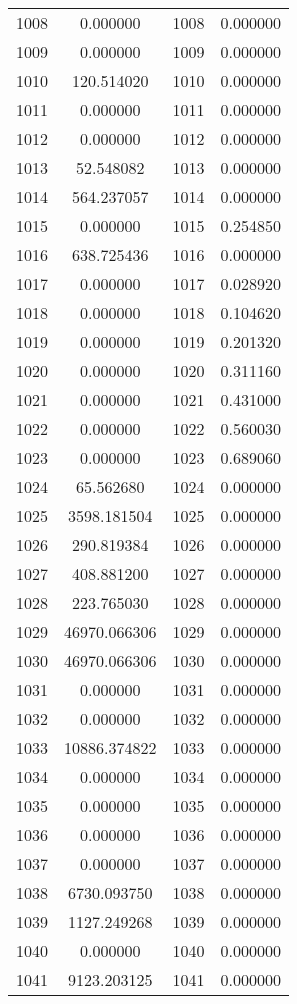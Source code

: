 \documentclass[12pt]{article}
\begin{document}
\begin{longtable}{@{}cccc@{}}
1008 & 0.000000 & 1008 & 0.000000 \\
1009 & 0.000000 & 1009 & 0.000000 \\
1010 & 120.514020 & 1010 & 0.000000 \\
1011 & 0.000000 & 1011 & 0.000000 \\
1012 & 0.000000 & 1012 & 0.000000 \\
1013 & 52.548082 & 1013 & 0.000000 \\
1014 & 564.237057 & 1014 & 0.000000 \\
1015 & 0.000000 & 1015 & 0.254850 \\
1016 & 638.725436 & 1016 & 0.000000 \\
1017 & 0.000000 & 1017 & 0.028920 \\
1018 & 0.000000 & 1018 & 0.104620 \\
1019 & 0.000000 & 1019 & 0.201320 \\
1020 & 0.000000 & 1020 & 0.311160 \\
1021 & 0.000000 & 1021 & 0.431000 \\
1022 & 0.000000 & 1022 & 0.560030 \\
1023 & 0.000000 & 1023 & 0.689060 \\
1024 & 65.562680 & 1024 & 0.000000 \\
1025 & 3598.181504 & 1025 & 0.000000 \\
1026 & 290.819384 & 1026 & 0.000000 \\
1027 & 408.881200 & 1027 & 0.000000 \\
1028 & 223.765030 & 1028 & 0.000000 \\
1029 & 46970.066306 & 1029 & 0.000000 \\
1030 & 46970.066306 & 1030 & 0.000000 \\
1031 & 0.000000 & 1031 & 0.000000 \\
1032 & 0.000000 & 1032 & 0.000000 \\
1033 & 10886.374822 & 1033 & 0.000000 \\
1034 & 0.000000 & 1034 & 0.000000 \\
1035 & 0.000000 & 1035 & 0.000000 \\
1036 & 0.000000 & 1036 & 0.000000 \\
1037 & 0.000000 & 1037 & 0.000000 \\
1038 & 6730.093750 & 1038 & 0.000000 \\
1039 & 1127.249268 & 1039 & 0.000000 \\
1040 & 0.000000 & 1040 & 0.000000 \\
1041 & 9123.203125 & 1041 & 0.000000 \\

\end{longtable}
\end{document}

